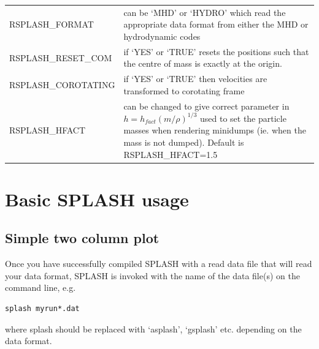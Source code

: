 \documentclass[a4paper,11pt]{article}
\begin{document}
\begin{tabular}{p{}p{}}
RSPLASH\_FORMAT & can be `MHD' or `HYDRO' which read the appropriate data format from either the MHD or hydrodynamic codes \\
RSPLASH\_RESET\_COM & if `YES' or `TRUE' resets the positions such that the centre of mass is exactly at the origin. \\
RSPLASH\_COROTATING & if `YES' or `TRUE' then velocities are transformed to corotating frame \\
RSPLASH\_HFACT & can be changed to give correct parameter in $h=h_{fact}(m/\rho)^{1/3}$ used to set the particle masses when rendering minidumps (ie. when the mass is not dumped). Default is RSPLASH\_HFACT=1.5
\end{tabular}
\section{Basic SPLASH usage}
\label{sec:basic}

\subsection{Simple two column plot}
 Once you have successfully compiled SPLASH with a read data file that will read your data format,
SPLASH is invoked with the name of the data
file(s) on the command line, e.g.
\begin{verbatim}
splash myrun*.dat
\end{verbatim}
where splash should be replaced with `asplash', `gsplash' etc. depending on the data format. \\
\end{document}
